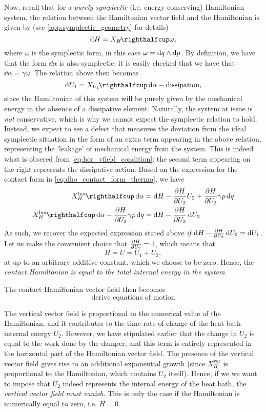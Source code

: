 Now, recall that for a \emph{purely symplectic} (i.e. energy-conserving) Hamiltonian system, the relation between the Hamiltonian vector field and the Hamiltonian is given by (see \cref{app:symplectic_geometry} for details) 
$$ \dd{H} = \intpr{X_H}{\omega}, $$
where $\omega$ is the symplectic form, in this case $\omega =  \dd{q}\wedge\dd{p} $. 
By definition, we have that the form $\dd{\alpha}$ is also symplectic; it is easily checked that we have that $\dd{\alpha} = \gamma \omega$. The relation above then becomes 
$$ \dd{U_1} = \intpr{X_{U_1}}{\dd{\alpha}} - \text{dissipation}, $$
since the Hamiltonian of this system will be purely given by the mechanical energy in the absence of a dissipative element. Naturally, the system at issue is \emph{not} conservative, which is why we cannot expect the symplectic relation to hold. Instead, we expect to see a defect that measures the deviation from the ideal symplectic situation in the form of an extra term appearing in the above relation, representing the `leakage' of mechanical energy from the system. This is indeed what is obsered from \cref{eq:hor_vfield_condition}: the second term appearing on the right represents the dissipative action. Based on the expression for the contact form in \cref{eq:dho_contact_form_thermo}, we have
\begin{equation} 
    \begin{split}
        \intpr{X_H^\text{hor}}{\dd{\alpha}} &= \dd{H}  - \pdv{H}{U_2}U_2 + \pdv{H}{U_2}\gamma p\dd{q} \\
        \intpr{X_H^\text{hor}}{\dd{\alpha}} - \pdv{H}{U_2}\gamma p\dd{q} &= \dd{H}  - \pdv{H}{U_2}\dd{U_2}
    \end{split}
\end{equation}
As such, we recover the expected expression stated above \emph{if} $\dd{H} - \pdv{H}{U_2}\dd{U_2} = \dd{U_1}$. Let us make the convenient choice that $\pdv{H}{U_2} = 1$, which means that 
$$ H = U = U_1 + U_2, $$
at up to an arbitrary additive constant, which we choose to be zero. Hence, the \emph{contact Hamiltonian is equal to the total internal energy in the system}.

The contact Hamiltonian vector field then becomes  
$$ \text{derive equations of motion} $$

The vertical vector field is proportional to the numerical value of the Hamiltonian, and it contributes to the time-rate of change of the heat bath internal energy $U_2$. However, we have stipulated earlier that the change in $U_2$ is equal to the work done by the damper, and this term is entirely represented in the horizontal part of the Hamiltonian vector field. The presence of the vertical vector field gives rise to an additional exponential growth (since $X_H^\text{ver}$ is proportional to the Hamiltonian, which contains $U_2$ itself). Hence, if we we want to impose that $U_2$ indeed represents the internal energy of the heat bath, the \emph{vertical vector field must vanish}. This is only the case if the Hamiltonian is numerically equal to zero, i.e. $H = 0$.

